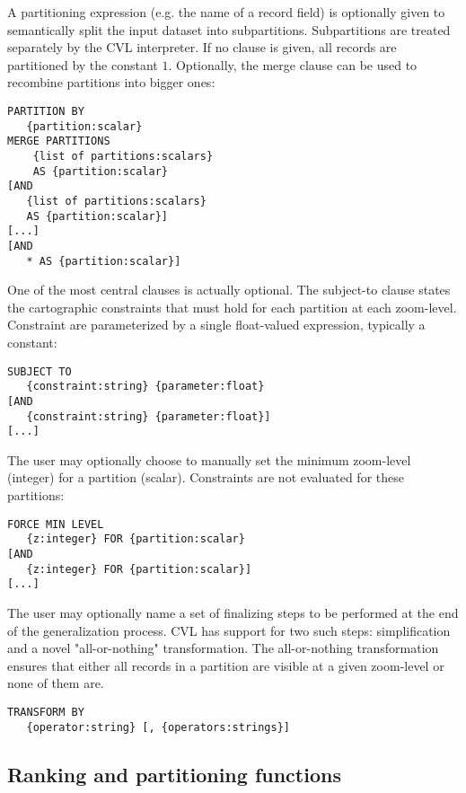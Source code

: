A partitioning expression (e.g. the name of a record field) is optionally given to semantically split the input dataset into subpartitions. Subpartitions are treated separately by the CVL interpreter. If no clause is given, all records are partitioned by the constant $1$. Optionally, the merge clause can be used to recombine partitions into bigger ones:

\begin{lstlisting}
PARTITION BY
   {partition:scalar}
MERGE PARTITIONS    
    {list of partitions:scalars}
    AS {partition:scalar}
[AND 
   {list of partitions:scalars} 
   AS {partition:scalar}]
[...]
[AND 
   * AS {partition:scalar}]
\end{lstlisting}

One of the most central clauses is actually optional. The subject-to clause states the cartographic constraints that must hold for each partition at each zoom-level. Constraint are parameterized by a single float-valued expression, typically a constant:

\begin{lstlisting}
SUBJECT TO 
   {constraint:string} {parameter:float} 
[AND
   {constraint:string} {parameter:float}]
[...]
\end{lstlisting}

The user may optionally choose to manually set the minimum zoom-level (integer) for a partition (scalar). Constraints are not evaluated for these partitions:

\begin{lstlisting}
FORCE MIN LEVEL
   {z:integer} FOR {partition:scalar}
[AND
   {z:integer} FOR {partition:scalar}]
[...]
\end{lstlisting}

The user may optionally name a set of finalizing steps to be performed at the end of the generalization process. CVL has support for two such steps: simplification and a novel "all-or-nothing" transformation. The all-or-nothing transformation ensures that either all records in a partition are visible at a given zoom-level or none of them are.

\begin{lstlisting}
TRANSFORM BY
   {operator:string} [, {operators:strings}]
\end{lstlisting}

\subsection{Ranking and partitioning functions}

